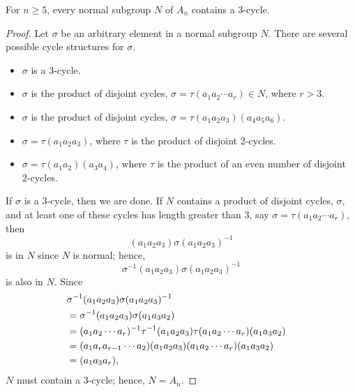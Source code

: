 
\begin{lemma}\label{normal:3cycle_lemma3}
For $n \geq 5$, every normal subgroup $N$ of $A_n$ contains a
$3$-cycle. 
\end{lemma}
 
 
\begin{proof}
Let $\sigma$ be an arbitrary element in a normal subgroup $N$. There
are several possible cycle structures for $\sigma$.
\begin{itemize}
 
\item
$\sigma$ is a 3-cycle.
 
\item
$\sigma$ is the product of disjoint cycles, $\sigma = \tau(a_1 a_2
\cdots a_r) \in N$, where $r >3$.
 
 
\item
$\sigma$ is the product of disjoint cycles, $\sigma = \tau(a_1 a_2
a_3)(a_4 a_5 a_6)$.
 
 
\item
$\sigma = \tau(a_1 a_2 a_3)$, where $\tau$ is the product of disjoint
2-cycles. 
 
 
\item
$\sigma =
\tau (a_1 a_2) (a_3 a_4) $, where $\tau$ is the product of an even
number of disjoint 2-cycles. 
 
 
\end{itemize}
If $\sigma$ is a $3$-cycle, then we are done. If $N$ contains a
product of disjoint cycles, $\sigma$, and at least one of these cycles
has length greater than 3, say $\sigma = \tau(a_1 a_2 \cdots a_r)$,
then   
\[
(a_1 a_2 a_3)\sigma(a_1 a_2 a_3)^{-1}
\]
is in $N$ since $N$ is normal; hence,
\[
\sigma^{-1}(a_1 a_2 a_3)\sigma(a_1 a_2 a_3)^{-1}
\]
is also in $N$. Since
\begin{align*}
\lefteqn{\sigma^{-1}(a_1 a_2 a_3)\sigma(a_1 a_2 a_3)^{-1} } \\
& = \sigma^{-1}(a_1 a_2 a_3)\sigma(a_1 a_3 a_2) \\
& = (a_1 a_2 \cdots a_r)^{-1}\tau^{-1}(a_1 a_2 a_3) 
      \tau(a_1 a_2 \cdots a_r)(a_1 a_3 a_2) \\
& = (a_1 a_r a_{r-1} \cdots a_2 )(a_1 a_2 a_3) 
      (a_1 a_2 \cdots a_r)(a_1 a_3 a_2) \\
& = (a_1 a_3 a_r),
\end{align*}
$N$ must contain a 3-cycle; hence, $N = A_n$.
 
 
 

\end{proof}
